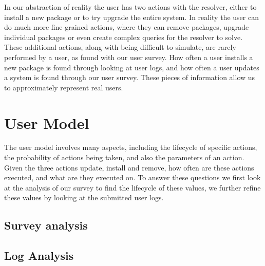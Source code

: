 In our abstraction of reality the user has two actions with the resolver, either to install a new package or to try upgrade the entire system.  
In reality the user can do much more fine grained actions, where they can remove packages, 
upgrade individual packages or even create complex queries for the resolver to solve. 
These additional actions, along with being difficult to simulate, are rarely performed by a user, as found with our user survey. %
How often a user installs a new package is found through looking at user logs, %
and how often a user updates a system is found through our user survey.
These pieces of information allow us to approximately represent real users.


\section{User Model}
{}The user model involves many aspects, including the lifecycle of specific actions, the probability of actions being taken, and also the parameters of an action.
{}Given the three actions update, install and remove, how often are these actions executed, and what are they executed on.
{}To answer these questions we first look at the analysis of our survey to find the lifecycle of these values, we further refine these values by looking at the submitted user logs.

\subsection{Survey analysis}




\subsection{Log Analysis}


